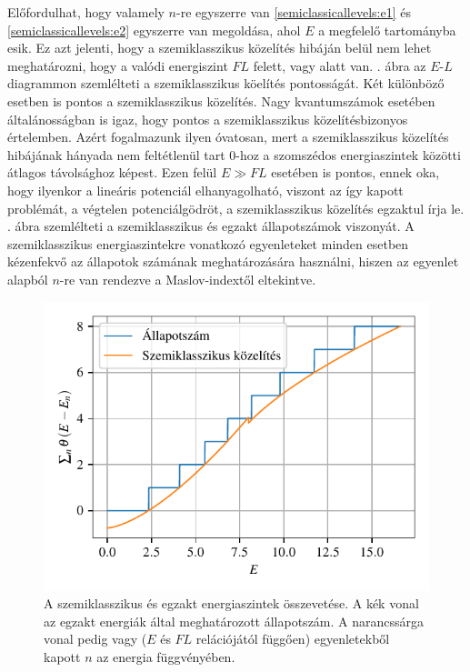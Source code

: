 Előfordulhat, hogy valamely $n$-re egyszerre van \eqref{semiclassicallevels:e1} és \eqref{semiclassicallevels:e2} egyszerre van megoldása, ahol $E$ a megfelelő tartományba esik. Ez azt jelenti, hogy a szemiklasszikus közelítés hibáján belül nem lehet meghatározni, hogy a valódi energiszint $FL$ felett, vagy alatt van. . ábra az $E$-$L$ diagrammon szemlélteti a szemiklasszikus köelítés pontosságát. Két különböző esetben is pontos a szemiklasszikus közelítés. Nagy kvantumszámok esetében általánosságban is igaz, hogy pontos a szemiklasszikus közelítésbizonyos értelemben. Azért fogalmazunk ilyen óvatosan, mert a szemiklasszikus közelítés hibájának hányada nem feltétlenül tart 0-hoz a szomszédos energiaszintek közötti átlagos távolsághoz képest. \cite{Robnik_1997} Ezen felül $E\gg FL$ esetében is pontos, ennek oka, hogy ilyenkor a lineáris potenciál elhanyagolható, viszont az így kapott problémát, a végtelen potenciálgödröt, a szemiklasszikus közelítés egzaktul írja le. . ábra szemlélteti a szemiklasszikus és egzakt állapotszámok viszonyát. A szemiklasszikus energiaszintekre vonatkozó egyenleteket minden esetben kézenfekvő az állapotok számának meghatározására használni, hiszen az egyenlet alapból $n$-re van rendezve a Maslov-indextől eltekintve. 
\begin{figure}[H]
	\centering
	\includegraphics[scale=1]{./figs/allapotszam.pdf}
	\caption[Szemiklasszikus állapotszám]{A szemiklasszikus és egzakt energiaszintek összevetése. A kék vonal az egzakt energiák által meghatározott állapotszám. A narancssárga vonal pedig  vagy  ($E$ és $FL$ relációjától függően) egyenletekből kapott $n$ az energia függvényében.}
	\label{semiclassicallevels:allapotszam}
\end{figure}
